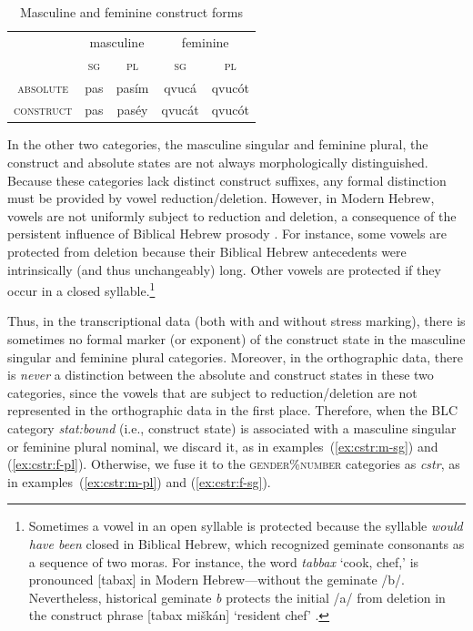 {\begin{description}
   \begin{table}[t]
      \centering
      \setlength{\extrarowheight}{8pt}
         \small
      \begin{tabular}{ccccc} 
 \toprule
 &  \multicolumn{2}{c}{masculine} & \multicolumn{2}{c}{feminine} \\
 &  \textsc{sg} & \textsc{pl} & \textsc{sg} & \textsc{pl} \\
 \cmidrule{2-3} \cmidrule{4-5}
   \textsc{absolute} & pas & pas\'{i}m  & qvuc\'{a}	& qvuc\'{o}t \\
     \textsc{construct} & pas & pas\'{e}y & qvuc\'{a}t	& qvuc\'{o}t\\
    \bottomrule
    \end{tabular}
     \caption{Masculine and feminine construct forms}
             \label{tab:cstr-endings}
    \end{table}
    
In the other two categories, the masculine singular and feminine plural, 
the construct and absolute states are not always morphologically distinguished. 
Because these categories lack distinct construct suffixes, any formal distinction must 
be provided by vowel reduction/deletion. However, in Modern Hebrew, vowels are 
not uniformly subject to reduction and deletion, a consequence of the 
persistent influence of Biblical Hebrew prosody \citep{morag:1959, bolozky:1997, ravid-and-shlesinger:2001}. 
For instance, some vowels are protected from deletion because their 
Biblical Hebrew antecedents were intrinsically (and thus unchangeably) long. 
Other vowels are protected if they occur in a closed syllable.\footnote{Sometimes 
a vowel in an open syllable is protected because the syllable \emph{would have been} 
closed in Biblical Hebrew, which recognized geminate consonants as a sequence of two 
moras. For instance, the word \textit{tabbax} `cook, chef,' is pronounced [tabax] in Modern Hebrew---without the geminate /b/. Nevertheless, historical geminate \textit{b} protects the initial /a/ from deletion in the construct phrase [tabax  mi\v{s}k\'an] `resident chef' \citep[see][p. 43]{bolozky-and-schwarzwald:1990}.}

Thus, in the transcriptional data (both with and without stress marking), there 
is sometimes no formal marker (or exponent) of the construct state in the masculine singular 
and feminine plural categories. 
Moreover, in the orthographic data, there is \emph{never} a distinction between 
the absolute and construct states in these 
two categories, since the vowels that are subject to reduction/deletion are not represented in the 
orthographic data in the first place.
Therefore, when the BLC category \textit{stat:bound} (i.e., construct state) 
is associated with a masculine singular or feminine plural nominal, we discard it, 
as in examples~(\ref{ex:cstr:m-sg}) and (\ref{ex:cstr:f-pl}). Otherwise, we fuse 
it to the \textsc{gender}\%\textsc{number} categories as \textit{cstr}, as 
in examples~(\ref{ex:cstr:m-pl}) and (\ref{ex:cstr:f-sg}).


\end{description}}
